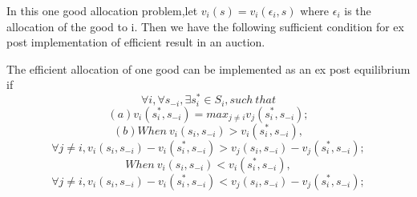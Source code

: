 In this one good allocation problem,let $v_i(s)=v_i(\epsilon_i,s)$ where $\epsilon_i$ is the allocation of the good to i. Then we
have the following sufficient condition for ex post implementation of efficient result in an auction.
\begin{prop}
The efficient allocation of one good can be implemented  as an ex post equilibrium
if  
 $$\forall i,\forall s_{-i}, \exists s_i^* \in S_i, such\ that $$
 $$(a) v_i(s_i^*, s_{-i}) = max_{j\not = i} v_j(s_i^*, s_{-i}); $$
 $$(b) When\ v_i(s_i, s_{-i}) > v_i(s_i^*, s_{-i}), $$
  $$\forall j \not = i, v_i(s_i, s_{-i}) - v_i(s_i^*, s_{-i}) > v_j(s_i, s_{-i}) - v_j(s_i^*, s_{-i});$$
  $$When\ v_i(s_i, s_{-i}) < v_i(s_i^*, s_{-i}), $$
  $$\forall j \not = i, v_i(s_i, s_{-i}) - v_i(s_i^*, s_{-i}) < v_j(s_i, s_{-i}) - v_j(s_i^*, s_{-i});  $$
 
\end{prop}
